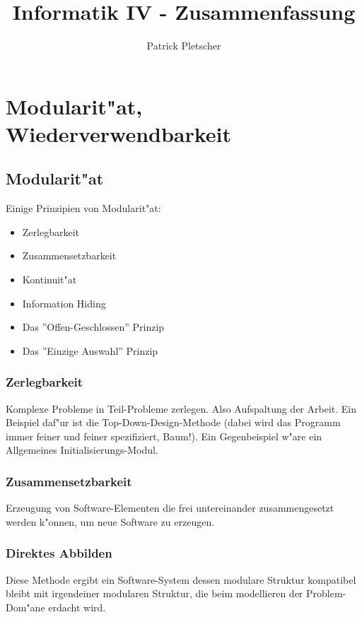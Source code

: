 \documentclass[german, 10pt, a4paper, twocolumn]{scrartcl}
\title{Informatik IV - Zusammenfassung}
\author{Patrick Pletscher}
\theoremstyle{definition}
\begin{document}
\maketitle

\section{Modularit"at, Wiederverwendbarkeit}

\subsection{Modularit"at}

Einige Prinzipien von Modularit"at:
\begin{itemize}
	\item Zerlegbarkeit
	\item Zusammensetzbarkeit
	\item Kontinuit"at
	\item Information Hiding
	\item Das ''Offen-Geschlossen'' Prinzip
	\item Das ''Einzige Auswahl'' Prinzip
\end{itemize}

\subsubsection{Zerlegbarkeit}

Komplexe Probleme in Teil-Probleme zerlegen. Also Aufspaltung der Arbeit. Ein Beispiel daf"ur ist die Top-Down-Design-Methode (dabei wird das Programm immer feiner und feiner spezifiziert, Baum!). Ein Gegenbeispiel w"are ein Allgemeines Initialisierungs-Modul.

\subsubsection{Zusammensetzbarkeit}

Erzeugung von Software-Elementen die frei untereinander zusammengesetzt werden k"onnen, um neue Software zu erzeugen.

\subsubsection{Direktes Abbilden}

Diese Methode ergibt ein Software-System dessen modulare Struktur kompatibel bleibt mit irgendeiner modularen Struktur, die beim modellieren der Problem-Dom"ane erdacht wird.
\end{document}
